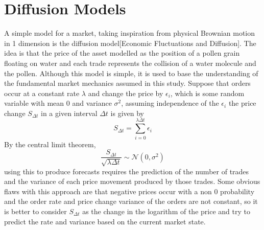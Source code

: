 \documentclass[a4paper,10pt]{article}
\begin{document}
\section{Diffusion Models}
A simple model for a market, taking inspiration from physical Brownian motion in 1 dimension is the diffusion model[Economic Fluctuations and Diffusion]. The idea is that the price of the asset modelled as the position of a pollen grain floating on water and each trade represents the collision of a water molecule and the pollen. Although this model is simple, it is used to base the understanding of the fundamental market mechanics assumed in this study. Suppose that orders occur at a constant rate $\lambda$ and change the price by $\epsilon_i$, which is some random variable with mean 0 and variance $\sigma^2$, assuming independence of the $\epsilon_i$ the price change $S_{\Delta t}$ in a given interval $\Delta t$ is given by
\begin{equation}
S_{\Delta t} = \sum_{i = 0}^{\lambda \Delta t}\epsilon_i
\end{equation}
By the central limit theorem, 
\begin{equation}
\frac{S_{\Delta t}}{\sqrt{\lambda \Delta t}} \sim \mathcal{N}(0, \sigma^{2})
\end{equation}
using this to produce forecasts requires the prediction of the number of trades and the variance of each price movement produced by those trades. Some obvious flaws with this approach are that negative prices occur with a non 0 probability and the order rate and price change variance of the orders are not constant, so it is better to consider $S_{\Delta t}$ as the change in the logarithm of the price and try to predict the rate and variance based on the current market state.
\end{document}
